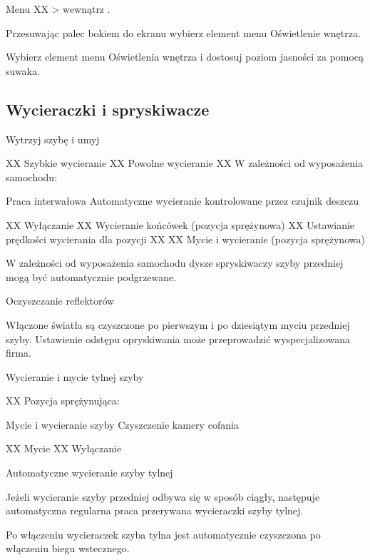 Menu XX > wewnątrz .

Przesuwając palec bokiem do ekranu wybierz element menu Oświetlenie wnętrza.

\begin{itemizeArrow}
	\itemArrow Wybierz element menu Oświetlenia wnętrza i dostosuj poziom jasności za pomocą suwaka.
\end{itemizeArrow}

\subsection{Wycieraczki i spryskiwacze}

Wytrzyj szybę i umyj


XX Szybkie wycieranie
XX Powolne wycieranie
XX W zależności od wyposażenia samochodu:
\begin{itemizeTriangle}
	\itemTriangle Praca interwałowa
	\itemTriangle Automatyczne wycieranie kontrolowane przez czujnik deszczu
\end{itemizeTriangle}

XX Wyłączanie
XX Wycieranie końcówek (pozycja sprężynowa)
XX Ustawianie prędkości wycierania dla pozycji XX
XX Mycie i wycieranie (pozycja sprężynowa)

W zależności od wyposażenia samochodu dysze spryskiwaczy szyby przedniej mogą być automatycznie podgrzewane.

Oczyszczanie reflektorów

Włączone światła są czyszczone po pierwszym i po dziesiątym myciu przedniej szyby.
Ustawienie odstępu opryskiwania może przeprowadzić wyspecjalizowana firma.

Wycieranie i mycie tylnej szyby


XX Pozycja sprężynująca:
\begin{itemizeTriangle}
	\itemTriangle Mycie i wycieranie szyby
	\itemTriangle Czyszczenie kamery cofania
\end{itemizeTriangle}
XX Mycie
XX Wyłączanie

Automatyczne wycieranie szyby tylnej

Jeżeli wycieranie szyby przedniej odbywa się w sposób ciągły, następuje automatyczna regularna praca przerywana wycieraczki szyby tylnej.

Po włączeniu wycieraczek szyba tylna jest automatycznie czyszczona po włączeniu biegu wstecznego.

